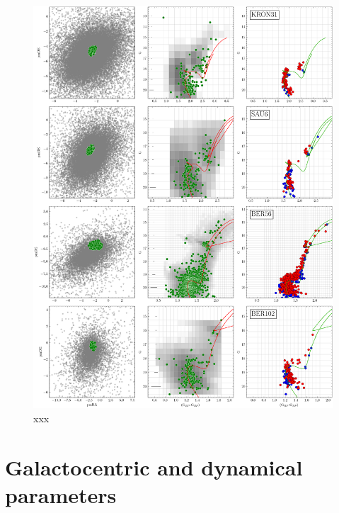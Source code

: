 \documentclass[draft]{aa}
\begin{document}
\begin{appendix}
 \begin{figure}
  \centering
  \includegraphics[height=.95\textheight]{figs/20_fpars.png}
  \caption{xxx}
  \label{fig:20fpars}
 \end{figure}



\section{Galactocentric and dynamical parameters}
\label{app:galac_dynam}


\end{appendix}
\end{document}
